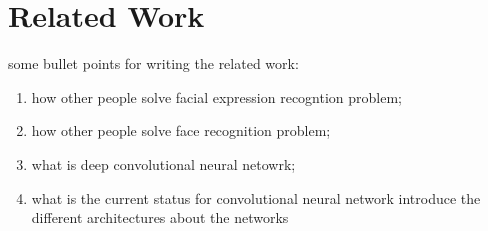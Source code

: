 
\section{Related Work}

some bullet points for writing the related work:
\begin{enumerate}
\item how other people solve facial expression recogntion problem;
\item how other people solve face recognition problem;
\item what is deep convolutional neural netowrk;
\item what is the current status for convolutional neural network
	introduce the different architectures about the networks
\end{enumerate}